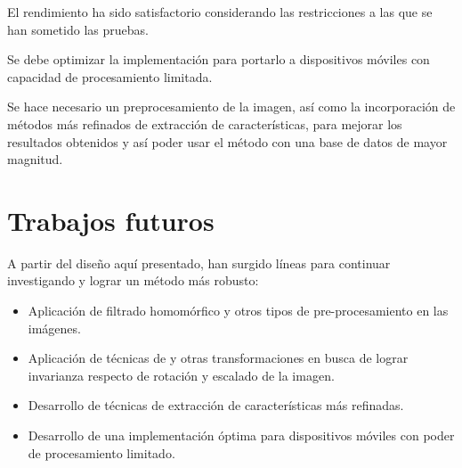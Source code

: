 \documentclass[conference,a4paper,10pt,oneside,final]{tfmpd}
\begin{document}
El rendimiento ha sido satisfactorio considerando las restricciones a las
que se han sometido las pruebas.

Se debe optimizar la implementación para portarlo a dispositivos móviles
con capacidad de procesamiento limitada.

Se hace necesario un preprocesamiento de la imagen, así como la incorporación
de métodos más refinados de extracción de características, para mejorar los
resultados obtenidos y así poder usar el método con una base de datos de
mayor magnitud.
%
%
%
%
\section{Trabajos futuros}
A partir del diseño aquí presentado, han surgido líneas para continuar
investigando y lograr un método más robusto:
\begin{itemize}
\item Aplicación de filtrado homomórfico y otros tipos de
      pre-procesamiento en las imágenes.
\item Aplicación de técnicas de  y otras transformaciones en busca
      de lograr invarianza respecto de rotación y escalado de la imagen.
\item Desarrollo de técnicas de extracción de características más {refinadas}.
\item Desarrollo de una implementación óptima para dis\-po\-si\-ti\-vos
      móviles con poder de procesamiento limitado.
\end{itemize}
\nocite{*}


\end{document}
